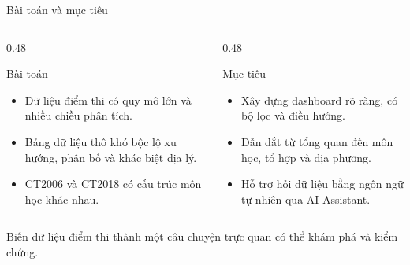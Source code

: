 \documentclass[aspectratio=169,11pt]{beamer}
\begin{document}
\begin{frame}{Bài toán và mục tiêu}
  \begin{columns}[T,onlytextwidth]
    \begin{column}{0.48\textwidth}
      \begin{block}{Bài toán}
        \begin{itemize}
          \item Dữ liệu điểm thi có quy mô lớn và nhiều chiều phân tích.
          \item Bảng dữ liệu thô khó bộc lộ xu hướng, phân bố và khác biệt địa lý.
          \item CT2006 và CT2018 có cấu trúc môn học khác nhau.
        \end{itemize}
      \end{block}
    \end{column}
    \begin{column}{0.48\textwidth}
      \begin{block}{Mục tiêu}
        \begin{itemize}
          \item Xây dựng dashboard rõ ràng, có bộ lọc và điều hướng.
          \item Dẫn dắt từ tổng quan đến môn học, tổ hợp và địa phương.
          \item Hỗ trợ hỏi dữ liệu bằng ngôn ngữ tự nhiên qua AI Assistant.
        \end{itemize}
      \end{block}
    \end{column}
  \end{columns}
  \vspace{0.25cm}
  \centering
  \alert{Biến dữ liệu điểm thi thành một câu chuyện trực quan có thể khám phá và kiểm chứng.}
\end{frame}
\end{document}

